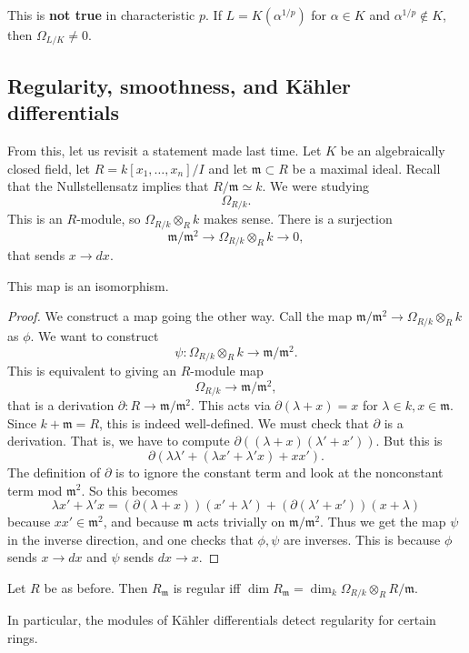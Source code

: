 This is \textbf{not true} in characteristic $p$. If $L = K(\alpha^{1/p})$ for
$\alpha \in K$ and $\alpha^{1/p} \notin K$, then $\Omega_{L/K} \neq 0$.

\subsection{Regularity, smoothness, and K\"ahler differentials}
From this, let us revisit a statement made last time. 
Let $K$ be an algebraically closed field, let $R = k[x_1, \dots, x_n]/I$ and
let $\mathfrak{m} \subset R$ be a maximal ideal. Recall that the
Nullstellensatz implies that $R/\mathfrak{m} \simeq k$. We were studying 
\[ \Omega_{R/k}.  \]
This is an $R$-module, so $\Omega_{R/k} \otimes_R k$ makes sense. There is a
surjection
\[ \mathfrak{m}/\mathfrak{m}^2 \to \Omega_{R/k} \otimes_R k \to 0,  \]
that sends $x \to dx$.
\begin{proposition} 
This map is an isomorphism.
\end{proposition} 
\begin{proof} 
We construct a map going the other way. Call the map $\mathfrak{m}/\mathfrak{m}^2 \to
\Omega_{R/k} \otimes_R k$ as $\phi$. We want to construct
\[ \psi: \Omega_{R/k} \otimes_R k \to \mathfrak{m}/\mathfrak{m}^2.  \]
This is equivalent to giving an $R$-module map 
\[ \Omega_{R/k} \to \mathfrak{m}/\mathfrak{m}^2,  \]
that is a derivation $\partial: R \to \mathfrak{m}/\mathfrak{m}^2$. This acts
via $\partial(\lambda + x) = x$ for $\lambda \in k, x \in \mathfrak{m}$. Since
$k+\mathfrak{m} = R$, this is indeed well-defined. We must check that
$\partial$ is a derivation. That is, we have to compute
$\partial((\lambda+x)(\lambda' + x'))$.
But this is 
\[ \partial(\lambda\lambda' + (\lambda x' + \lambda' x) + xx').  \]
The definition of $\partial$ is to ignore the constant term and look at the
nonconstant term mod $\mathfrak{m}^2$. So this becomes
\[ \lambda x' + \lambda' x = (\partial (\lambda+x)) (x'+\lambda') + (\partial (\lambda'+
x')) (x+\lambda)  \]
because $xx' \in \mathfrak{m}^2$, and because $\mathfrak{m}$ acts trivially on
$\mathfrak{m}/\mathfrak{m}^2$. Thus we get the map $\psi$ in the inverse
direction, and one checks that $\phi, \psi$ are inverses. This is because
$\phi$ sends $x \to dx$ and $\psi$ sends $dx \to x$.
\end{proof} 

\begin{corollary} 
Let $R$ be as before. Then $R_{\mathfrak{m}}$ is regular iff $\dim
R_{\mathfrak{m}} = \dim_k \Omega_{R/k} \otimes_R R/\mathfrak{m}$.
\end{corollary} 
In particular, the modules of K\"ahler differentials detect regularity for
certain rings.

